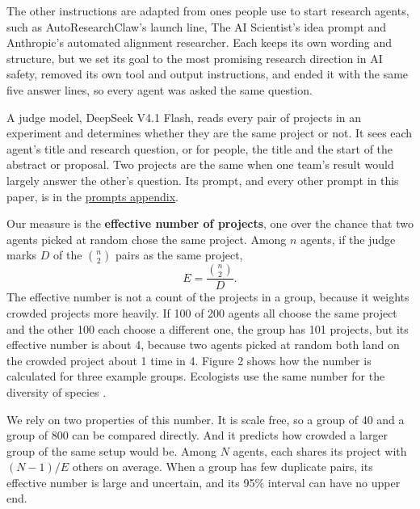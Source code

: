 \documentclass[11pt]{article}
\begin{document}
The other instructions are adapted from ones people use to start
research agents, such as AutoResearchClaw's launch line, The AI
Scientist's idea prompt and Anthropic's automated alignment researcher.
Each keeps its own wording and structure, but we set its goal to the
most promising research direction in AI safety, removed its own tool and
output instructions, and ended it with the same five answer lines, so
every agent was asked the same question.

A judge model, DeepSeek V4.1 Flash, reads every pair of projects in an
experiment and determines whether they are the same project or not. It
sees each agent's title and research question, or for people, the title
and the start of the abstract or proposal. Two projects are the same
when one team's result would largely answer the other's question. Its
prompt, and every other prompt in this paper, is in the
\href{https://github.com/AverroesLabs/ai-research-agent-diversity/blob/main/prompts/README.md}{prompts
appendix}.

Our measure is the \textbf{effective number of projects}, one over the
chance that two agents picked at random chose the same project. Among
\(n\) agents, if the judge marks \(D\) of the \(\binom{n}{2}\) pairs as
the same project, \[E = \frac{\binom{n}{2}}{D}.\] The effective number
is not a count of the projects in a group, because it weights crowded
projects more heavily. If 100 of 200 agents all choose the same project
and the other 100 each choose a different one, the group has 101
projects, but its effective number is about 4, because two agents picked
at random both land on the crowded project about 1 time in 4. Figure 2
shows how the number is calculated for three example groups. Ecologists
use the same number for the diversity of species
\citep{simpson1949,hill1973,jost2006}.

We rely on two properties of this number. It is scale free, so a group
of 40 and a group of 800 can be compared directly. And it predicts how
crowded a larger group of the same setup would be. Among \(N\) agents,
each shares its project with \((N-1)/E\) others on average. When a group
has few duplicate pairs, its effective number is large and uncertain,
and its 95\% interval can have no upper end.
\end{document}
